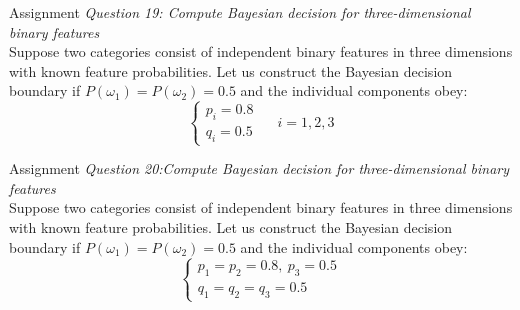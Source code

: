 \begin{frame}{Assignment}
\textit{\color{slidecolor}Question 19: Compute Bayesian decision for three-dimensional binary features}\\
Suppose two categories consist of independent binary features in three dimensions
with known feature probabilities. Let us construct the Bayesian decision boundary if
$P(\omega_1 ) = P(\omega_2 )=0.5$ and the individual components obey:
\begin{equation}
\left\{ {\begin{array}{*{20}{c}}
{{p_i} = 0.8}\\
{{q_i} = 0.5}
\end{array}} \right.~~~~~~i = 1,2,3\nonumber
\end{equation}
\end{frame}

\begin{frame}{Assignment}
\textit{\color{slidecolor}Question 20:Compute Bayesian decision for three-dimensional binary features}\\
Suppose two categories consist of independent binary features in three dimensions
with known feature probabilities. Let us construct the Bayesian decision boundary if
$P(\omega_1 ) = P(\omega_2 )=0.5$ and the individual components obey:
\begin{equation}
\left\{ {\begin{array}{*{20}{c}}
{{p_1} = {p_2}=0.8},~p_3=0.5\\
{{q_1} = {q_2} = {q_3} = 0.5}
\end{array}} \right.\nonumber
\end{equation}
\end{frame}


